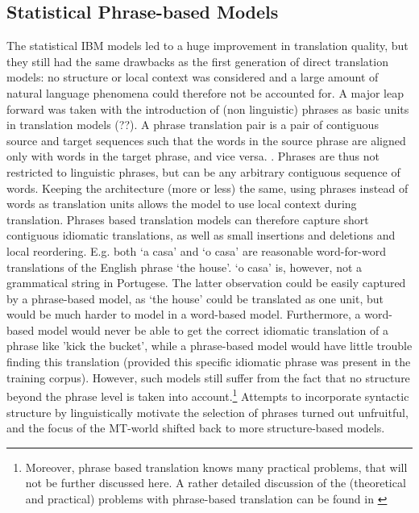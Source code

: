 \documentclass{report}
\theoremstyle{definition}
\theoremstyle{plain}
\begin{document}
\subsection{Statistical Phrase-based Models}

The statistical IBM models led to a huge improvement in translation quality, but they still had the same drawbacks as the first generation of direct translation models: no structure or local context was considered and a large amount of natural language phenomena could therefore not be accounted for. A major leap forward was taken with the introduction of (non linguistic) phrases as basic units in translation models (\cite{wang1998grammar,och1999improved}??). A phrase translation pair is a pair of contiguous source and target sequences such that the words in the source phrase are aligned only with words in the target phrase, and vice versa. \citep{och2004alignment}. Phrases are thus not restricted to linguistic phrases, but can be any arbitrary contiguous sequence of words. Keeping the architecture (more or less) the same, using phrases instead of words as translation units allows the model to use local context during translation. Phrases based translation models can therefore capture short contiguous idiomatic translations, as well as small insertions and deletions and local reordering. E.g. both `a casa' and `o casa' are reasonable word-for-word translations of the English phrase `the house'. `o casa' is, however, not a grammatical string in Portugese. The latter observation could be easily captured by a phrase-based model, as `the house' could be translated as one unit, but would be much harder to model in a word-based model. Furthermore, a word-based model would never be able to get the correct idiomatic translation of a phrase like 'kick the bucket', while a phrase-based model would have little trouble finding this translation (provided this specific idiomatic phrase was present in the training corpus). However, such models still suffer from the fact that no structure beyond the phrase level is taken into account.\footnote{Moreover, phrase based translation knows many practical problems, that will not be further discussed here. A rather detailed discussion of the (theoretical and practical) problems with phrase-based translation can be found in \cite{quirk2006we}} Attempts to incorporate syntactic structure by linguistically motivate the selection of phrases \citep{koehn2003statistical} turned out unfruitful, and the focus of the MT-world shifted back to more structure-based models.
\end{document}
